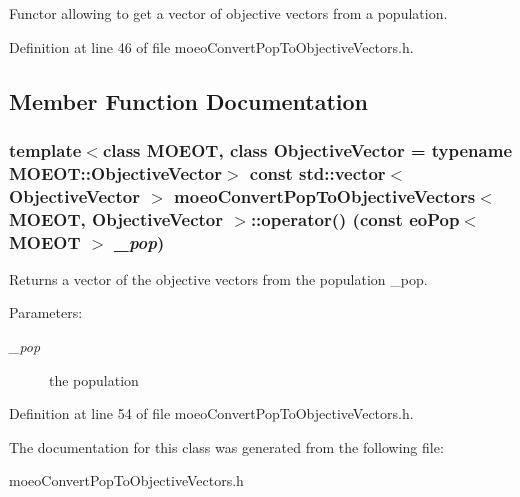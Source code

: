 Functor allowing to get a vector of objective vectors from a population. 



Definition at line 46 of file moeo\-Convert\-Pop\-To\-Objective\-Vectors.h.

\subsection{Member Function Documentation}
\subsubsection{\setlength{\rightskip}{0pt plus 5cm}template$<$class MOEOT, class Objective\-Vector = typename MOEOT::Objective\-Vector$>$ const std::vector$<$ Objective\-Vector $>$ \bf{moeo\-Convert\-Pop\-To\-Objective\-Vectors}$<$ MOEOT, Objective\-Vector $>$::operator() (const \bf{eo\-Pop}$<$ MOEOT $>$ {\em \_\-pop})\hspace{0.3cm}{\tt  [inline]}}\label{classmoeoConvertPopToObjectiveVectors_8fada75aa151a6eaa310c5064f783c86}


Returns a vector of the objective vectors from the population \_\-pop. 

\begin{Desc}
\item[Parameters:]
\begin{description}
\item[{\em \_\-pop}]the population \end{description}
\end{Desc}


Definition at line 54 of file moeo\-Convert\-Pop\-To\-Objective\-Vectors.h.

The documentation for this class was generated from the following file:\begin{CompactItemize}
\item 
moeo\-Convert\-Pop\-To\-Objective\-Vectors.h\end{CompactItemize}
